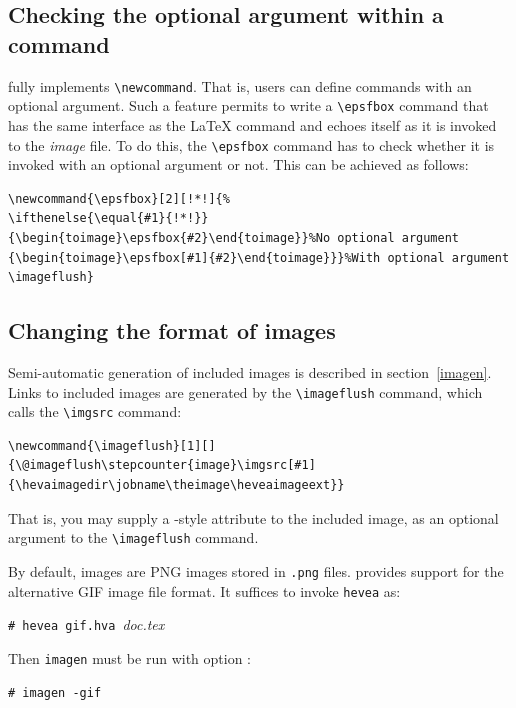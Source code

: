 \subsection{Checking the optional argument within a command}\label{fullepsfbox}
\hevea{} fully implements \LaTeXe{} \verb+\newcommand+.
That is, users can define commands with an optional argument.
Such a feature permits to write a \verb+\epsfbox+ command that
has the same interface as the \LaTeX{} command and
echoes itself as it is invoked to the \textit{image} file.
To do this, the \hevea{} \verb+\epsfbox+ command has to check
whether it is invoked with an optional argument or not.
This can be achieved as follows:
\begin{verbatim}
\newcommand{\epsfbox}[2][!*!]{%
\ifthenelse{\equal{#1}{!*!}}
{\begin{toimage}\epsfbox{#2}\end{toimage}}%No optional argument
{\begin{toimage}\epsfbox[#1]{#2}\end{toimage}}}%With optional argument
\imageflush}
\end{verbatim}

\subsection{Changing the format of images}
Semi-automatic generation of included images is described in
section~\ref{imagen}.
Links to included images are generated by the \verb+\imageflush+
command, which calls the \verb+\imgsrc+ command:
\begin{verbatim}
\newcommand{\imageflush}[1][]
{\@imageflush\stepcounter{image}\imgsrc[#1]{\hevaimagedir\jobname\theimage\heveaimageext}}
\end{verbatim}
That is, you may supply a \html-style attribute to the included image,
as an optional argument to the \verb+\imageflush+ command.

By default, images are PNG images stored in \texttt{.png} files.
\hevea{} provides support for the alternative GIF image file format.
It suffices to invoke \texttt{hevea} as:
\begin{flushleft}
\texttt{\#~hevea~gif.hva}~\textit{doc.tex}
\end{flushleft}
Then \texttt{imagen} must be run with option :
\begin{flushleft}
\texttt{\#~imagen~-gif}~
\end{flushleft}

